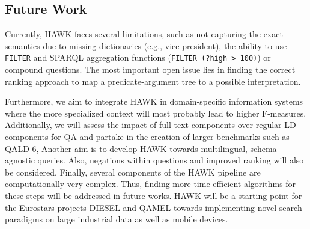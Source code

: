 \subsection*{Future Work}
Currently, HAWK faces several limitations, such as not capturing the exact semantics due to missing dictionaries (e.g., vice-president), the ability to use \texttt{FILTER} and SPARQL aggregation functions (\texttt{FILTER (?high > 100)}) or compound questions. 
The most important open issue lies in finding the correct ranking approach to map a predicate-argument tree to a possible interpretation. 

Furthermore, we aim to integrate HAWK in domain-specific information systems where the more specialized context will most probably lead to higher F-measures. 
Additionally, we will assess the impact of full-text components over regular LD components for \ac{QA} and partake in the creation of larger benchmarks such as \ac{QALD}-6,
Another aim is to develop HAWK towards multilingual, schema-agnostic queries.
Also, negations within questions and improved ranking will also be considered. 
Finally, several components of the HAWK pipeline are computationally very complex. 
Thus, finding more time-efficient algorithms for these steps will be addressed in future works.
HAWK will be a starting point for the Eurostars projects DIESEL and QAMEL towards implementing novel search paradigms on large industrial data as well as mobile devices.
